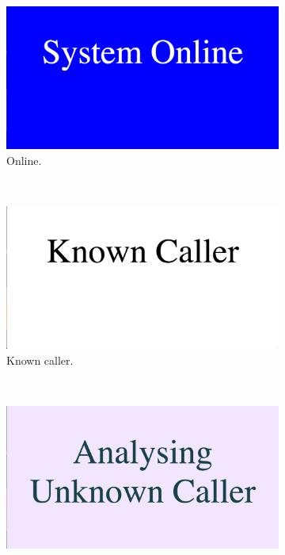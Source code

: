 \documentclass[main.tex]{subfiles}
\begin{document}
\begin{figure}[htb]
	\captionsetup[subfigure]{position=b}
        \centering
        \begin{subfigure}{0.45\textwidth}
                \includegraphics[width=\textwidth]{pics/state1}
                \caption{Online.}
                \label{fig:state1}
        \end{subfigure}
        ~
        \begin{subfigure}{0.45\textwidth}
                \includegraphics[width=\textwidth]{pics/state2}
                \caption{Known caller.}
                \label{fig:state2}
        \end{subfigure}
		\\
		\begin{subfigure}{0.45\textwidth}
				\includegraphics[width=\textwidth]{pics/state4}

\end{subfigure}
\end{figure}
\end{document}
